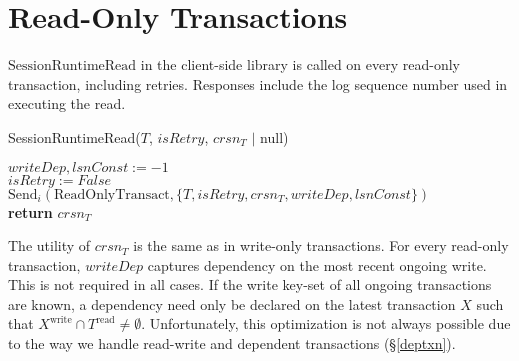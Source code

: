 \documentclass{article}
\begin{document}
\section{Read-Only Transactions} \label{rotxn}
 $\text{SessionRuntimeRead}$ in the client-side library is called on every read-only transaction, including retries. Responses include the log sequence number used in executing the read. \\
\begin{procedure}[H]
  \caption{SessionRuntimeRead($T$, $isRetry$, $crsn_T$ $|$ null)}
  $writeDep, lsnConst := -1$ \\
  $isRetry := False$   \\
   
  $\text{Send}_{i}(\text{ReadOnlyTransact}, \{T, isRetry, crsn_T, writeDep, lsnConst\})$ \\
  \textbf{return} $crsn_T$
\end{procedure}
The utility of $crsn_T$ is the same as in write-only transactions. For every read-only transaction, $writeDep$ captures dependency on the most recent ongoing write. This is not required in all cases. If the write key-set of all ongoing transactions are known, a dependency need only be declared on the latest transaction $X$ such that $X^{\text{write}} \cap T^{\text{read}} \neq \emptyset$. Unfortunately, this optimization is not always possible due to the way we handle read-write and dependent transactions (\S\ref{deptxn}). \\
\end{document}

